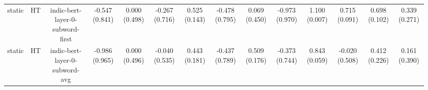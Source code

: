 \begin{sidewaystable}[htb]
\begin{tabular}{@{}cccccccccccccc@{}}
        static & HT & indic-bert-layer-0-subword-first & -0.547 (0.841) & 0.000 (0.498) & -0.267 (0.716) & 0.525 (0.143) & -0.478 (0.795) & 0.069 (0.450) & -0.973 (0.970) & 1.100 (0.007) & 0.715 (0.091) & 0.698 (0.102) & 0.339 (0.271) \\
        static & HT & indic-bert-layer-0-subword-avg & -0.986 (0.965) & 0.000 (0.496) & -0.040 (0.535) & 0.443 (0.181) & -0.437 (0.789) & 0.509 (0.176) & -0.373 (0.744) & 0.843 (0.059) & -0.020 (0.508) & 0.412 (0.226) & 0.161 (0.390) \\
        \bottomrule
    \end{tabular}
\end{sidewaystable}